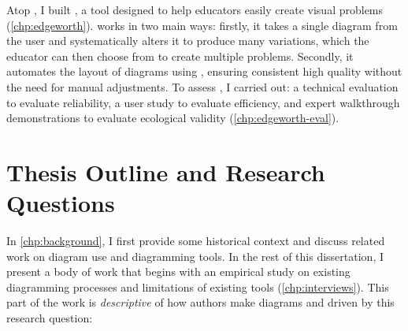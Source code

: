 Atop \Penrose, I built \Edgeworth, a tool designed to help educators easily create visual problems (\cref{chp:edgeworth}). \Edgeworth works in two main ways: firstly, it takes a single diagram from the user and systematically alters it to produce many variations, which the educator can then choose from to create multiple problems. Secondly, it automates the layout of diagrams using \Penrose, ensuring consistent high quality without the need for manual adjustments. To assess \Edgeworth, I carried out: a technical evaluation to evaluate reliability, a user study to evaluate efficiency, and expert walkthrough demonstrations to evaluate ecological validity (\cref{chp:edgeworth-eval}). 






\section{Thesis Outline and Research Questions}


In \cref{chp:background}, I first provide some historical context and discuss related work on diagram use and diagramming tools. In the rest of this dissertation, I present a body of work that begins with an empirical study on existing diagramming processes and limitations of existing tools (\cref{chp:interviews}). This part of the work is \textit{descriptive} of how authors make diagrams and driven by this research question:

